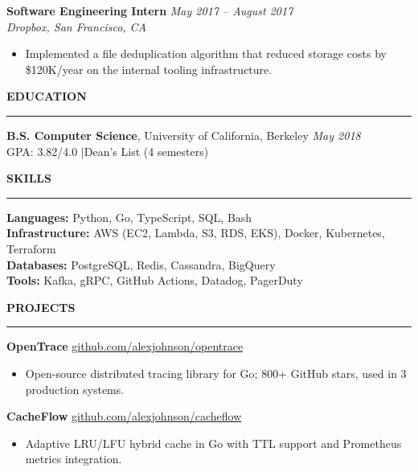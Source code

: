 \documentclass[11pt,a4paper]{article}
\newcommand{\sectionrule}{%
  \vspace{-4pt}\rule{\textwidth}{0.4pt}\vspace{2pt}%
}
\begin{document}
\vspace{6pt}
\noindent\textbf{Software Engineering Intern} \hfill \textit{May 2017 -- August 2017}\\
\textit{Dropbox, San Francisco, CA}
\begin{itemize}
  \item Implemented a file deduplication algorithm that reduced storage costs by \$120K/year on the internal tooling infrastructure.
\end{itemize}

\vspace{4pt}

\noindent\textbf{\large EDUCATION}\\
\sectionrule

\noindent\textbf{B.S. Computer Science}, University of California, Berkeley \hfill \textit{May 2018}\\
GPA: 3.82/4.0 \quad|\quad Dean's List (4 semesters)

\vspace{4pt}

\noindent\textbf{\large SKILLS}\\
\sectionrule

\noindent\textbf{Languages:} Python, Go, TypeScript, SQL, Bash\\
\textbf{Infrastructure:} AWS (EC2, Lambda, S3, RDS, EKS), Docker, Kubernetes, Terraform\\
\textbf{Databases:} PostgreSQL, Redis, Cassandra, BigQuery\\
\textbf{Tools:} Kafka, gRPC, GitHub Actions, Datadog, PagerDuty

\vspace{4pt}

\noindent\textbf{\large PROJECTS}\\
\sectionrule

\noindent\textbf{OpenTrace} \quad \href{https://github.com/alexjohnson/opentrace}{github.com/alexjohnson/opentrace}
\begin{itemize}
  \item Open-source distributed tracing library for Go; 800+ GitHub stars, used in 3 production systems.
\end{itemize}

\noindent\textbf{CacheFlow} \quad \href{https://github.com/alexjohnson/cacheflow}{github.com/alexjohnson/cacheflow}
\begin{itemize}
  \item Adaptive LRU/LFU hybrid cache in Go with TTL support and Prometheus metrics integration.
\end{itemize}
\end{document}

